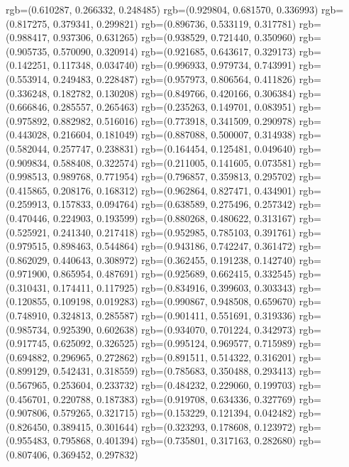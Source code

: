 {{{					rgb=(0.610287, 0.266332, 0.248485)
					rgb=(0.929804, 0.681570, 0.336993)
					rgb=(0.817275, 0.379341, 0.299821)
					rgb=(0.896736, 0.533119, 0.317781)
					rgb=(0.988417, 0.937306, 0.631265)
					rgb=(0.938529, 0.721440, 0.350960)
					rgb=(0.905735, 0.570090, 0.320914)
					rgb=(0.921685, 0.643617, 0.329173)
					rgb=(0.142251, 0.117348, 0.034740)
					rgb=(0.996933, 0.979734, 0.743991)
					rgb=(0.553914, 0.249483, 0.228487)
					rgb=(0.957973, 0.806564, 0.411826)
					rgb=(0.336248, 0.182782, 0.130208)
					rgb=(0.849766, 0.420166, 0.306384)
					rgb=(0.666846, 0.285557, 0.265463)
					rgb=(0.235263, 0.149701, 0.083951)
					rgb=(0.975892, 0.882982, 0.516016)
					rgb=(0.773918, 0.341509, 0.290978)
					rgb=(0.443028, 0.216604, 0.181049)
					rgb=(0.887088, 0.500007, 0.314938)
					rgb=(0.582044, 0.257747, 0.238831)
					rgb=(0.164454, 0.125481, 0.049640)
					rgb=(0.909834, 0.588408, 0.322574)
					rgb=(0.211005, 0.141605, 0.073581)
					rgb=(0.998513, 0.989768, 0.771954)
					rgb=(0.796857, 0.359813, 0.295702)
					rgb=(0.415865, 0.208176, 0.168312)
					rgb=(0.962864, 0.827471, 0.434901)
					rgb=(0.259913, 0.157833, 0.094764)
					rgb=(0.638589, 0.275496, 0.257342)
					rgb=(0.470446, 0.224903, 0.193599)
					rgb=(0.880268, 0.480622, 0.313167)
					rgb=(0.525921, 0.241340, 0.217418)
					rgb=(0.952985, 0.785103, 0.391761)
					rgb=(0.979515, 0.898463, 0.544864)
					rgb=(0.943186, 0.742247, 0.361472)
					rgb=(0.862029, 0.440643, 0.308972)
					rgb=(0.362455, 0.191238, 0.142740)
					rgb=(0.971900, 0.865954, 0.487691)
					rgb=(0.925689, 0.662415, 0.332545)
					rgb=(0.310431, 0.174411, 0.117925)
					rgb=(0.834916, 0.399603, 0.303343)
					rgb=(0.120855, 0.109198, 0.019283)
					rgb=(0.990867, 0.948508, 0.659670)
					rgb=(0.748910, 0.324813, 0.285587)
					rgb=(0.901411, 0.551691, 0.319336)
					rgb=(0.985734, 0.925390, 0.602638)
					rgb=(0.934070, 0.701224, 0.342973)
					rgb=(0.917745, 0.625092, 0.326525)
					rgb=(0.995124, 0.969577, 0.715989)
					rgb=(0.694882, 0.296965, 0.272862)
					rgb=(0.891511, 0.514322, 0.316201)
					rgb=(0.899129, 0.542431, 0.318559)
					rgb=(0.785683, 0.350488, 0.293413)
					rgb=(0.567965, 0.253604, 0.233732)
					rgb=(0.484232, 0.229060, 0.199703)
					rgb=(0.456701, 0.220788, 0.187383)
					rgb=(0.919708, 0.634336, 0.327769)
					rgb=(0.907806, 0.579265, 0.321715)
					rgb=(0.153229, 0.121394, 0.042482)
					rgb=(0.826450, 0.389415, 0.301644)
					rgb=(0.323293, 0.178608, 0.123972)
					rgb=(0.955483, 0.795868, 0.401394)
					rgb=(0.735801, 0.317163, 0.282680)
					rgb=(0.807406, 0.369452, 0.297832)
}}}
